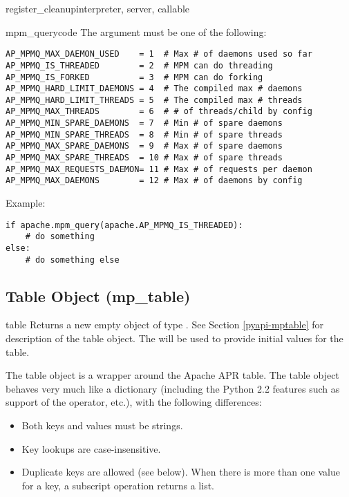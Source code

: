 \begin{funcdesc}{register_cleanup}{interpreter, server, callable}
\begin{funcdesc}{mpm_query}{code}
  The  argument must be one of the following:
  \begin{verbatim}
AP_MPMQ_MAX_DAEMON_USED    = 1  # Max # of daemons used so far 
AP_MPMQ_IS_THREADED        = 2  # MPM can do threading         
AP_MPMQ_IS_FORKED          = 3  # MPM can do forking           
AP_MPMQ_HARD_LIMIT_DAEMONS = 4  # The compiled max # daemons   
AP_MPMQ_HARD_LIMIT_THREADS = 5  # The compiled max # threads   
AP_MPMQ_MAX_THREADS        = 6  # # of threads/child by config 
AP_MPMQ_MIN_SPARE_DAEMONS  = 7  # Min # of spare daemons       
AP_MPMQ_MIN_SPARE_THREADS  = 8  # Min # of spare threads       
AP_MPMQ_MAX_SPARE_DAEMONS  = 9  # Max # of spare daemons       
AP_MPMQ_MAX_SPARE_THREADS  = 10 # Max # of spare threads       
AP_MPMQ_MAX_REQUESTS_DAEMON= 11 # Max # of requests per daemon 
AP_MPMQ_MAX_DAEMONS        = 12 # Max # of daemons by config   
  \end{verbatim}

Example:
  \begin{verbatim}
if apache.mpm_query(apache.AP_MPMQ_IS_THREADED):
    # do something
else:
    # do something else
  \end{verbatim}
\end{funcdesc}

\subsection{Table Object (mp_table)\label{pyapi-mptable}}

\begin{classdesc}{table}{}
  Returns a new empty object of type . See Section
  \ref{pyapi-mptable} for description of the table object. The
   will be used to provide initial values for
  the table.  

  The table object is a wrapper around the Apache APR table. The table
  object behaves very much like a dictionary (including the Python 2.2
  features such as support of the  operator, etc.), with the 
  following differences:

  \begin{itemize}
  \item
    Both keys and values must be strings.
  \item
    Key lookups are case-insensitive.
  \item
    Duplicate keys are allowed (see  below). When there is
    more than one value for a key, a subscript operation returns a list.
  \end{itemize}


\end{classdesc}
\end{funcdesc}
